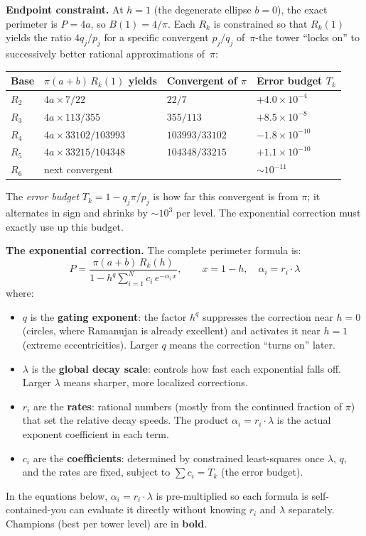 \documentclass[12pt]{article}
\begin{document}
\medskip
\noindent\textbf{Endpoint constraint.} At $h=1$ (the degenerate ellipse $b=0$), the exact perimeter is $P = 4a$, so $B(1) = 4/\pi$.  Each $R_k$ is constrained so that $R_k(1)$ yields the ratio $4q_j/p_j$ for a specific convergent $p_j/q_j$ of~$\pi$-the tower ``locks on'' to successively better rational approximations of~$\pi$:
\begin{center}\small
\begin{tabular}{llll}
\toprule
Base & $\pi(a+b)\,R_k(1)$ yields & Convergent of $\pi$ & Error budget $T_k$ \\
\midrule
$R_2$ & $4a \times 7/22$ & $22/7$ & $+4.0 \times 10^{-4}$ \\
$R_3$ & $4a \times 113/355$ & $355/113$ & $+8.5 \times 10^{-8}$ \\
$R_4$ & $4a \times 33102/103993$ & $103993/33102$ & $-1.8 \times 10^{-10}$ \\
$R_5$ & $4a \times 33215/104348$ & $104348/33215$ & $+1.1 \times 10^{-10}$ \\
$R_6$ & next convergent & & ${\sim}10^{-11}$ \\
\bottomrule
\end{tabular}
\end{center}
The \emph{error budget} $T_k = 1 - q_j\pi/p_j$ is how far this convergent is from $\pi$; it alternates in sign and shrinks by ${\sim}10^3$ per level. The exponential correction must exactly use up this budget.

\medskip
\noindent\textbf{The exponential correction.} The complete perimeter formula is:
\begin{equation*}
\boxed{P = \frac{\pi(a+b)\,R_k(h)}{1 - h^q \displaystyle\sum_{i=1}^{N} c_i\,e^{-\alpha_i\,x}},
\qquad x = 1-h, \quad \alpha_i = r_i \cdot \lambda}
\end{equation*}
where:
\begin{itemize}
\item $q$ is the \textbf{gating exponent}: the factor $h^q$ suppresses the correction near $h = 0$ (circles, where Ramanujan is already excellent) and activates it near $h = 1$ (extreme eccentricities). Larger $q$ means the correction ``turns on'' later.
\item $\lambda$ is the \textbf{global decay scale}: controls how fast each exponential falls off. Larger $\lambda$ means sharper, more localized corrections.
\item $r_i$ are the \textbf{rates}: rational numbers (mostly from the continued fraction of $\pi$) that set the relative decay speeds.  The product $\alpha_i = r_i \cdot \lambda$ is the actual exponent coefficient in each term.
\item $c_i$ are the \textbf{coefficients}: determined by constrained least-squares once $\lambda$, $q$, and the rates are fixed, subject to $\sum c_i = T_k$ (the error budget).
\end{itemize}
In the equations below, $\alpha_i = r_i \cdot \lambda$ is pre-multiplied so each formula is self-contained-you can evaluate it directly without knowing $r_i$ and $\lambda$ separately. Champions (best per tower level) are in \textbf{bold}.
\end{document}
